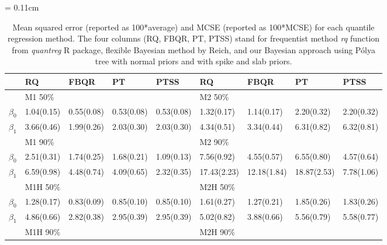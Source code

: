 \documentclass[12pt]{article}
\newcommand{\polya}{P\'{o}lya}
\begin{document}
\begin{center}
  \begin{table}[h]
    \centering
    \caption[]{ Mean squared error (reported as 100*average) and MCSE
      (reported as 100*MCSE) for each
      quantile regression method.   The four
      columns (RQ, FBQR,
      PT, PTSS) stand for frequentist method \textit{rq} function from
      \textit{quantreg} R package, flexible Bayesian method by Reich, and
      our Bayesian approach using \polya{} tree with normal priors and with
spike and slab priors.}
    \vspace{4mm}
    \tabcolsep = 0.11cm
    \begin{tabular}[tb]{c|llll|llll}
      \hline
      & RQ            & FBQR         & PT          & PTSS        & RQ            & FBQR        & PT          & PTSS        \\
      \hline
      & M1 50\%       &              &             &             & M2 50\%       &             &             &             \\
      $\beta_0$ & 1.04(0.15)    & 0.55(0.08)   & 0.53(0.08)  & 0.53(0.08)  & 1.32(0.17)    & 1.14(0.17)  & 2.20(0.32)  & 2.20(0.32)  \\
      $\beta_1$ & 3.66(0.46)    & 1.99(0.26)   & 2.03(0.30)  & 2.03(0.30)  & 4.34(0.51)    & 3.34(0.44)  & 6.31(0.82)  & 6.32(0.81)  \\
      & M1 90\%       &              &             &             & M2 90\%       &             &             &             \\
      $\beta_0$ & 2.51(0.31)    & 1.74(0.25)   & 1.68(0.21)  & 1.09(0.13)  & 7.56(0.92)    & 4.55(0.57)  & 6.55(0.80)  & 4.57(0.64)  \\
      $\beta_1$ & 6.59(0.98)    & 4.48(0.74)   & 4.09(0.65)  & 2.32(0.35)  & 17.43(2.23)   & 12.18(1.84) & 18.87(2.53) & 7.78(1.06)  \\
      \hline
      & M1H 50\%       &              &             &             & M2H 50\%       &             &             &             \\
      $\beta_0$ & 1.28(0.17)    & 0.83(0.09)   & 0.85(0.10)  & 0.85(0.10)  & 1.61(0.27)    & 1.27(0.21)  & 1.85(0.26)  & 1.83(0.26)  \\
      $\beta_1$ & 4.86(0.66)    & 2.82(0.38)   & 2.95(0.39)  & 2.95(0.39)  & 5.02(0.82)    & 3.88(0.66)  & 5.56(0.79)  & 5.58(0.77)  \\
      & M1H 90\%       &              &             &             & M2H 90\%       &             &             &             \\

\end{tabular}
\end{table}
\end{center}
\end{document}
